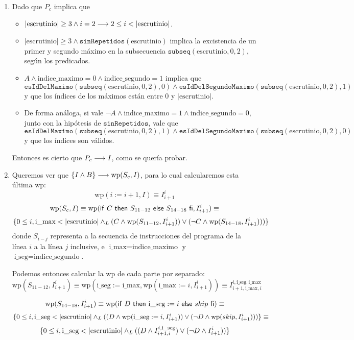 \documentclass[10pt,a4paper]{article}
\newcommand{\predRef}{\texttt}
\newcommand{\var}{\text}
\renewcommand{\wp}{\text{wp}}
\begin{document}
\begin{enumerate}
    \item Dado que $P_c$ implica que
    \begin{itemize}
        \item $|\var{escrutinio}|\geq 3 \land i = 2 \implica 2 \leq i < |\var{escrutinio}|$.
        \item $|\var{escrutinio}|\geq 3 \land \predRef{sinRepetidos}(\var{escrutinio})$ implica la excistencia de un primer y segundo máximo en la subsecuencia $\predRef{subseq}(\var{escrutinio}, 0, 2)$, según los predicados.
        \item $A\land \var{indice\_maximo} = 0 \land \var{indice\_segundo} = 1$ implica que
        $$\predRef{esIdDelMaximo}(\predRef{subseq}(\var{escrutinio}, 0, 2), 0) \land \predRef{esIdDelSegundoMaximo}(\predRef{subseq}(\var{escrutinio}, 0, 2), 1)$$
        y que los índices de los máximos están entre 0 y $|\var{escrutinio}|$.
        \item De forma análoga, si vale $\neg A \land \var{indice\_maximo} = 1 \land \var{indice\_segundo} = 0$, junto con la hipótesis de $\predRef{sinRepetidos}$, vale que
        $$\predRef{esIdDelMaximo}(\predRef{subseq}(\var{escrutinio}, 0, 2), 1) \land \predRef{esIdDelSegundoMaximo}(\predRef{subseq}(\var{escrutinio}, 0, 2), 0)$$
        y que los índices son válidos.
    \end{itemize}
    Entonces es cierto que $P_c \longrightarrow I$, como se quería probar.
    
    \item Queremos ver que $\{I \land B\} \implica \wp(S_c, I)$, para lo cual calcularemos esta última wp:
    $$\wp(i := i + 1, I) \equiv I_{i+1}^i$$
    $$\wp(S_c, I) \equiv \wp(\IfThenElse{C}{S_{11-12}}{S_{14-18}}, I_{i+1}^i) \equiv$$
    $$\{0 \leq i, \var{i\_max} < |\var{escrutinio}|\yLuego (C \land \wp(S_{11-12}, I_{i+1}^i)) \lor (\neg C \land \wp(S_{14-18}, I_{i+1}^i))) \}$$
    donde $S_{i-j}$ representa a la secuencia de instrucciones del programa de la línea $i$ a la línea $j$ inclusive, e $\var{i\_max} = \var{indice\_maximo}$ y $\var{i\_seg} = \var{indice\_segundo}$.

    Podemos entonces calcular la wp de cada parte por separado:
    $$\wp(S_{11-12}, I_{i+1}^i) \equiv \wp(\var{i\_seg} := \var{i\_max}, \wp(\var{i\_max} := i, I_{i+1}^i)) \equiv I_{i+1, \var{i\_max}, i}^{i, \var{i\_seg}, \var{i\_max}}$$
    

    $$\wp(S_{14-18}, I_{i+1}^i) \equiv \wp(\IfThenElse{D}{\var{i\_seg} := i}{skip}) \equiv$$
    $$\{0 \leq i, \var{i\_seg} < |\var{escrutinio}| \yLuego ((D \land \wp(\var{i\_seg} := i, I_{i+1}^i)) \lor (\neg D \land \wp(skip, I_{i+1}^i)))\} \equiv$$
    $$\{0 \leq i, \var{i\_seg} < |\var{escrutinio}| \yLuego ((D \land I_{i+1,i}^{i, \var{i\_seg}}) \lor (\neg D \land I_{i+1}^i))\}$$
    

\end{enumerate}
\end{document}
